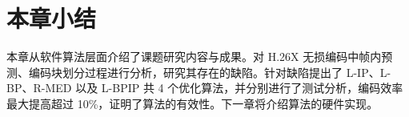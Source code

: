 \section{本章小结}
本章从软件算法层面介绍了课题研究内容与成果。对 H.26X 无损编码中帧内预测、编码块划分过程进行分析，研究其存在的缺陷。针对缺陷提出了 L-IP、L-BP、R-MED 以及 L-BPIP 共 4 个优化算法，并分别进行了测试分析，编码效率最大提高超过 10\%，证明了算法的有效性。下一章将介绍算法的硬件实现。